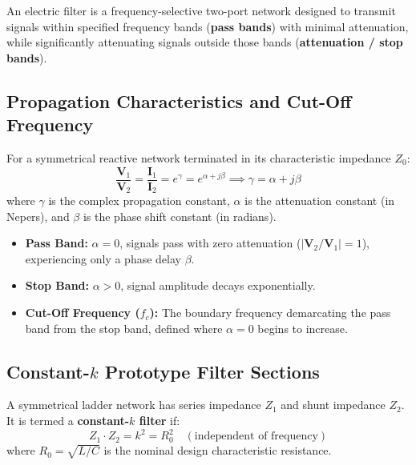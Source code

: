 \documentclass[12pt,a4paper]{article}
\begin{document}
An electric filter is a frequency-selective two-port network designed to transmit signals within specified frequency bands (\textbf{pass bands}) with minimal attenuation, while significantly attenuating signals outside those bands (\textbf{attenuation / stop bands}).

\subsection{Propagation Characteristics and Cut-Off Frequency}

For a symmetrical reactive network terminated in its characteristic impedance $Z_0$:
\begin{equation}
  \frac{\mathbf{V}_1}{\mathbf{V}_2} = \frac{\mathbf{I}_1}{\mathbf{I}_2} = e^\gamma = e^{\alpha + j\beta} \implies \gamma = \alpha + j\beta
\end{equation}
where $\gamma$ is the complex propagation constant, $\alpha$ is the attenuation constant (in Nepers), and $\beta$ is the phase shift constant (in radians).
\begin{itemize}[leftmargin=*]
  \item \textbf{Pass Band:} $\alpha = 0$, signals pass with zero attenuation ($|\mathbf{V}_2/\mathbf{V}_1| = 1$), experiencing only a phase delay $\beta$.
  \item \textbf{Stop Band:} $\alpha > 0$, signal amplitude decays exponentially.
  \item \textbf{Cut-Off Frequency ($f_c$):} The boundary frequency demarcating the pass band from the stop band, defined where $\alpha = 0$ begins to increase.
\end{itemize}

\subsection{Constant-$k$ Prototype Filter Sections}

A symmetrical ladder network has series impedance $Z_1$ and shunt impedance $Z_2$. It is termed a \textbf{constant-$k$ filter} if:
\begin{equation}
  Z_1 \cdot Z_2 = k^2 = R_0^2 \quad (\text{independent of frequency})
\end{equation}
where $R_0 = \sqrt{L/C}$ is the nominal design characteristic resistance.
\end{document}

